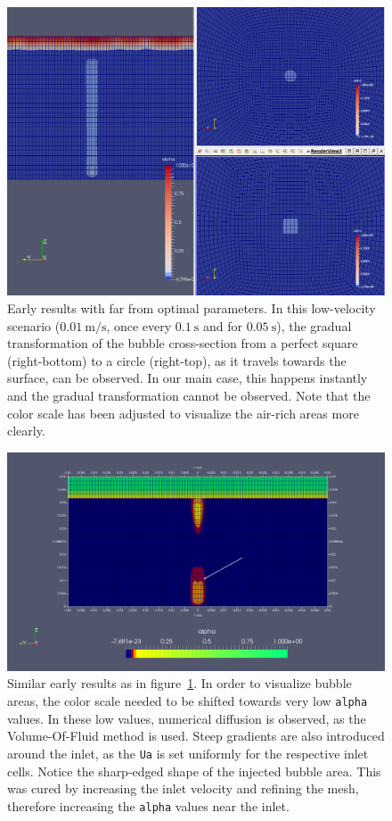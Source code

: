 \documentclass[11pt, a4paper, twoside]{article}
\begin{document}
\begin{figure}
    \centering
    \includegraphics[width=\textwidth]{figures/square_to_round_early}
    \caption{Early results with far from optimal parameters. In this low-velocity scenario ($\SI{0.01}{\metre/\second}$, once every $\SI{0.1}{\second}$ and for $\SI{0.05}{\second}$), the gradual transformation of the bubble cross-section from a perfect square (right-bottom) to a circle (right-top), as it travels towards the surface, can be observed. In our main case, this happens instantly and the gradual transformation cannot be observed. Note that the color scale has been adjusted to visualize the air-rich areas more clearly.}
    \label{fig:square_to_round}
\end{figure}

\begin{figure}
    \centering
    \includegraphics[width=\textwidth]{figures/early_numerical_diffusion_annotated}
    \caption{Similar early results as in figure~\ref{fig:square_to_round}. In order to visualize bubble areas, the color scale needed to be shifted towards very low \texttt{alpha} values. In these low values, numerical diffusion is observed, as the Volume-Of-Fluid method is used. Steep gradients are also introduced around the inlet, as the \texttt{Ua} is set uniformly for the respective inlet cells. Notice the sharp-edged shape of the injected bubble area. This was cured by increasing the inlet velocity and refining the mesh, therefore increasing the \texttt{alpha} values near the inlet.}
    \label{fig:numerical_diffusion}
\end{figure}
\end{document}
